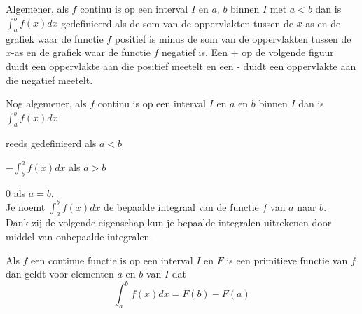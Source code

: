 
\begin{center}
	
\end{center}


Algemener, als $f$ continu is op een interval $I$ en $a$, $b$ binnen $I$ met $a<b$ dan is $\int ^b_a f(x)dx$ gedefinieerd als de som van de oppervlakten tussen de $x$-as en de grafiek waar de functie $f$ positief is minus de som van de oppervlakten tussen de $x$-as en de grafiek waar de functie $f$ negatief is.
Een + op de volgende figuur duidt een oppervlakte aan die positief meetelt en een - duidt een oppervlakte aan die negatief meetelt.\\


\begin{center}
	
\end{center}



Nog algemener, als $f$ continu is op een interval $I$ en $a$ en $b$ binnen $I$ dan is $\int ^b_a f(x)dx$

\hspace{1cm} reeds gedefinieerd als $a<b$

\hspace{1cm} $-\int^a_b f(x)dx$ als $a>b$

\hspace{1cm} 0 als $a=b$.\\

Je noemt $\int^b_a f(x)dx$ de bepaalde integraal van de functie $f$ van $a$ naar $b$.\\

Dank zij de volgende eigenschap kun je bepaalde integralen uitrekenen door middel van onbepaalde integralen.

\begin{eigenschap} Als $f$ een continue functie is op een interval $I$ en $F$ is een primitieve functie van $f$ dan geldt voor elementen $a$ en $b$ van $I$ dat\\
\[\int^b_a f(x)dx = F(b)-F(a)\]
\end{eigenschap}

